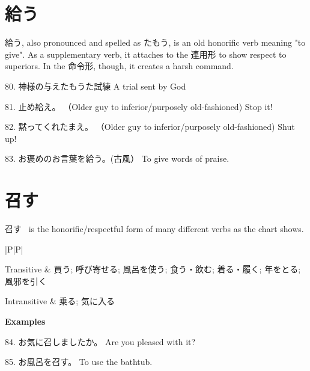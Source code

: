 \section{給う}
 
\par{ 給う, also pronounced and spelled as たもう, is an  old honorific verb meaning "to give". As a supplementary verb, it  attaches to the 連用形 to show respect to superiors. In the 命令形, though, it creates a harsh command. }

\par{80. 神様の与えたもうた試練 \hfill\break
A trial sent by God }

\par{81. 止め給え。 （Older guy to inferior\slash purposely old-fashioned) \hfill\break
Stop it! }

\par{82. 黙ってくれたまえ。 （Older guy to inferior\slash purposely old-fashioned) \hfill\break
Shut up! }

\par{83. お褒めのお言葉を給う。(古風） \hfill\break
To give words of praise. }
      
\section{召す}
 
\par{  召す  is the honorific\slash respectful form of many different verbs as the chart shows. }

\begin{ltabulary}{|P|P|}
\hline 

Transitive & 買う; 呼び寄せる; 風呂を使う; 食う・飲む; 着る・履く; 年をとる; 風邪を引く \\ 

Intransitive & 乗る; 気に入る \\ 

\end{ltabulary}

\begin{center}
 \textbf{Examples }
\end{center}

\par{84. お気に召しましたか。 \hfill\break
Are you pleased with it? }

\par{85. お風呂を召す。 \hfill\break
To use the bathtub. \hfill\break
}
 
